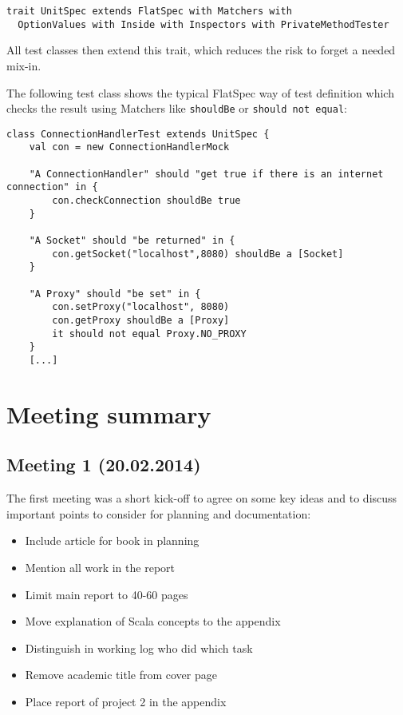 \documentclass[
	a4paper,					10pt,							twoside,					openright,				notitlepage,			parskip=half,			]{scrreprt}
\begin{document}
\begin{lstlisting}
trait UnitSpec extends FlatSpec with Matchers with
  OptionValues with Inside with Inspectors with PrivateMethodTester
\end{lstlisting}

All test classes then extend this trait, which reduces the risk to forget a needed mix-in. 

The following test class shows the typical FlatSpec way of test definition which checks the result
using Matchers like \verb|shouldBe| or \verb|should not equal|:

\begin{lstlisting}
class ConnectionHandlerTest extends UnitSpec {
	val con = new ConnectionHandlerMock

	"A ConnectionHandler" should "get true if there is an internet connection" in {
		con.checkConnection shouldBe true
	}
	
	"A Socket" should "be returned" in {
		con.getSocket("localhost",8080) shouldBe a [Socket]
	}
	
	"A Proxy" should "be set" in {
		con.setProxy("localhost", 8080)
		con.getProxy shouldBe a [Proxy]
		it should not equal Proxy.NO_PROXY
	}
	[...]
\end{lstlisting}\clearpage{}
\clearpage{}

\chapter{Meeting summary}
\label{chap:meeting}
\section*{Meeting 1 (20.02.2014)}
\label{sec:meeting_1}

The first meeting was a short kick-off to agree on some key ideas 
and to discuss important points to consider for planning and documentation:
\begin{itemize}
\item{Include article for book in planning}
\item{Mention all work in the report}
\item{Limit main report to 40-60 pages}
\item{Move explanation of Scala concepts to the appendix}
\item{Distinguish in working log who did which task}
\item{Remove academic title from cover page}
\item{Place report of project 2 in the appendix}
\end{itemize}
\end{document}
